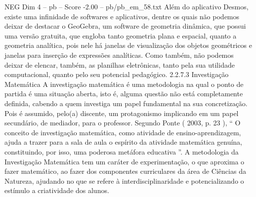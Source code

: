 \begin{textsample}{NEG Dim 4 – pb – Score -2.00 – pb/pb\_em\_58.txt}
Além do aplicativo Desmos, existe uma infinidade de softwares e aplicativos, dentre os quais não podemos deixar de destacar o GeoGebra, um software de geometria dinâmica, que possui uma versão gratuita, que engloba tanto geometria plana e espacial, quanto a geometria analítica, pois nele há janelas de visualização dos objetos geométricos e janelas para inserção de expressões analíticas.
Como também, não podemos deixar de elencar, também, as planilhas eletrônicas, tanto pela sua utilidade computacional, quanto pelo seu potencial pedagógico. 2.2.7.3 Investigação Matemática A investigação matemática é uma metodologia na qual o ponto de partida é uma situação aberta, isto é, alguma questão não está completamente definida, cabendo a quem investiga um papel fundamental na sua concretização.
Pois é assumido, pelo(a) discente, um protagonismo implicando em um papel secundário, de mediador, para o professor.
Segundo Ponte ( 2003, p. 23 ), “ O conceito de investigação matemática, como atividade de ensino-aprendizagem, ajuda a trazer para a sala de aula o espírito da atividade matemática genuína, constituindo, por isso, uma poderosa metáfora educativa ”.
A metodologia da Investigação Matemática tem um caráter de experimentação, o que aproxima o fazer matemático, ao fazer dos componentes curriculares da área de Ciências da Natureza, ajudando no que se refere à interdisciplinaridade e potencializando o estímulo a criatividade dos alunos.

\end{textsample}
